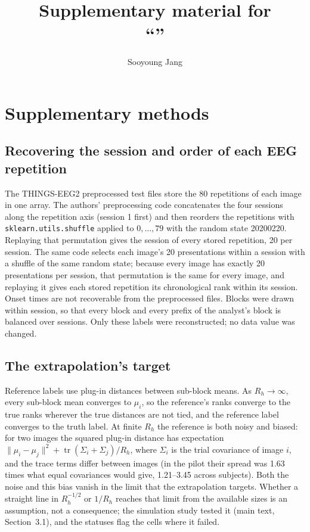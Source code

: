 \documentclass[11pt]{article}
\title{Supplementary material for\\ ``\MsTitle''}
\author{Sooyoung Jang}
\date{}
\newcommand{\PilotSpread}{1.63}
\newcommand{\PilotSpreadLo}{1.21}
\newcommand{\PilotSpreadHi}{3.45}
\begin{document}
\maketitle

\section{Supplementary methods}

\subsection{Recovering the session and order of each EEG repetition}
The THINGS-EEG2 preprocessed test files store the 80 repetitions of each image in one array.
The authors' preprocessing code concatenates the four sessions along the repetition axis (session 1 first) and then reorders the repetitions with \texttt{sklearn.utils.shuffle} applied to $0,\dots,79$ with the random state 20200220.
Replaying that permutation gives the session of every stored repetition, 20 per session.
The same code selects each image's 20 presentations within a session with a shuffle of the same random state; because every image has exactly 20 presentations per session, that permutation is the same for every image, and replaying it gives each stored repetition its chronological rank within its session.
Onset times are not recoverable from the preprocessed files.
Blocks were drawn within session, so that every block and every prefix of the analyst's block is balanced over sessions.
Only these labels were reconstructed; no data value was changed.

\subsection{The extrapolation's target}
Reference labels use plug-in distances between sub-block means.
As $R_h\to\infty$, every sub-block mean converges to $\mu_i$, so the reference's ranks converge to the true ranks wherever the true distances are not tied, and the reference label converges to the truth label.
At finite $R_h$ the reference is both noisy and biased: for two images the squared plug-in distance has expectation $\|\mu_i-\mu_j\|^2+\operatorname{tr}(\Sigma_i+\Sigma_j)/R_h$, where $\Sigma_i$ is the trial covariance of image $i$, and the trace terms differ between images (in the pilot their spread was \PilotSpread{} times what equal covariances would give, \PilotSpreadLo--\PilotSpreadHi{} across subjects).
Both the noise and this bias vanish in the limit that the extrapolation targets.
Whether a straight line in $R_h^{-1/2}$ or $1/R_h$ reaches that limit from the available sizes is an assumption, not a consequence; the simulation study tested it (main text, Section~3.1), and the statuses flag the cells where it failed.
\end{document}

